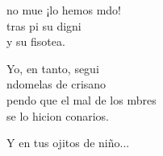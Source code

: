 \begin{cancion}
\begin{chorus}
		no mue ¡lo hemos mdo!\\
		tras pi su digni \\
		y su fisotea.\jump\\
	\end{chorus}%
	Yo, en tanto, segui \\
	ndomelas de crisano\\
	pendo que el mal de los mbres\\
	se lo hicion  conarios.\jump\\
	\begin{chorus}%
	Y en tus ojitos de niño...\jump\\
	\end{chorus}%
	\jump
\end{cancion}%
